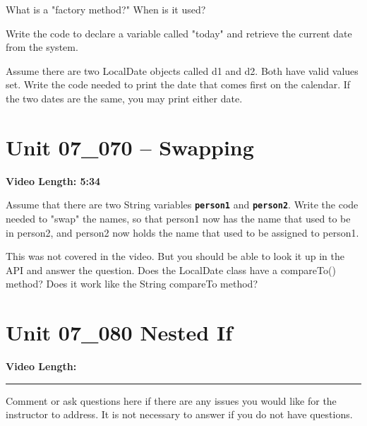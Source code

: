 \documentclass[letterpaper,12pt]{exam}
\newcommand{\unit}{Unit 07}
\begin{document}
\begin{questions}
\begin{samepage}
    \question What is a "factory method?"  When is it used?
    \vspace{5mm}
\end{samepage}
\begin{samepage}
    \question Write the code to declare a variable called "today" and retrieve the current date from the system.
    \vspace{5mm}
\end{samepage}
\begin{samepage}
    \question Assume there are two LocalDate objects called d1 and d2.  Both have valid values set.  Write the code needed to print the date that comes first on the calendar.  If the two dates are the same, you may print either date.
    \vspace{25mm}
\end{samepage}



\section*{\unit\_070 -- Swapping} %
\noindent \textbf{Video Length: 5:34}

\begin{samepage}
    \question Assume that there are two String variables \texttt{\textbf{person1}} and \texttt{\textbf{person2}}. Write the code needed to "swap" the names, so that person1 now has the name that used to be in person2, and person2 now holds the name that used to be assigned to person1.  
    \vspace{5mm}
\end{samepage}

\begin{samepage}
    \question This was not covered in the video.  But you should be able to look it up in the API and answer the question.  Does the LocalDate class have a compareTo() method?  Does it work like the String compareTo method?
    \vspace{5mm}
\end{samepage}


\section*{\unit\_080 Nested If} %
\noindent \textbf{Video Length: }

\begin{samepage}
    \begin{center}
    \rule{0.8\textwidth}{.4pt}
    \end{center}
	\question Comment or ask questions here if there are any issues you would like for the instructor to address.  It is not necessary to answer if you do not have questions.
	\vspace{30mm}
\end{samepage}

\end{questions}
\end{document}

